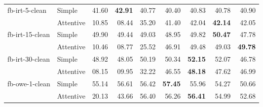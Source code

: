 \begin{tabular}{| l | l | r | r | r | r | r | r | r |}
    \multirow{2}{*}{fb-irt-5-clean}
    & Simple    & 41.60 & \textbf{42.91} & 40.77 & 40.40 & 40.83 & 40.78 & 40.90 \\
    & Attentive & 10.85 & 08.44 & 35.20 & 41.40 & 42.04 & \textbf{42.14} & 42.05 \\ \hline

    \multirow{2}{*}{fb-irt-15-clean}
    & Simple    & 49.90 & 49.44 & 49.03 & 48.95 & 49.82 & \textbf{50.47} & 47.78 \\
    & Attentive & 10.46 & 08.77 & 25.52 & 46.91 & 49.48 & 49.03 & \textbf{49.78} \\ \hline

    \multirow{2}{*}{fb-irt-30-clean}
    & Simple    & 48.92 & 48.05 & 50.19 & 50.34 & \textbf{52.15} & 52.07 & 46.78 \\
    & Attentive & 08.15 & 09.95 & 32.22 & 46.55 & \textbf{48.18} & 47.62 & 46.99 \\ \hline

    \multirow{2}{*}{fb-owe-1-clean}
    & Simple    & 55.14 & 56.61 & 56.42 & \textbf{57.45} & 55.96 & 54.27 & 50.66 \\
    & Attentive & 20.13 & 43.66 & 56.40 & 56.26 & \textbf{56.41} & 54.99 & 52.68 \\ \hline

\end{tabular}
